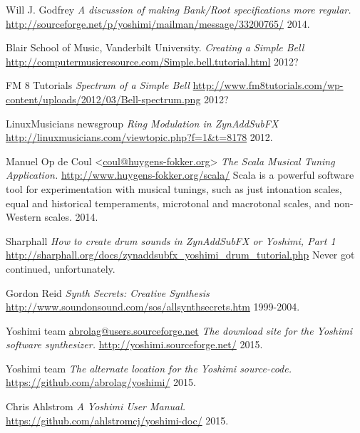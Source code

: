\begin{thebibliography}{99}

   Will J. Godfrey
   \emph{A discussion of making Bank/Root specifications more regular.}
   \url{http://sourceforge.net/p/yoshimi/mailman/message/33200765/}
   2014.

   Blair School of Music, Vanderbilt University.
   \emph{Creating a Simple Bell}
   \url{http://computermusicresource.com/Simple.bell.tutorial.html}
   2012?

   FM 8 Tutorials
   \emph{Spectrum of a Simple Bell}
   \url{http://www.fm8tutorials.com/wp-content/uploads/2012/03/Bell-spectrum.png}
   2012?

   LinuxMusicians newsgroup
   \emph{Ring Modulation in ZynAddSubFX}
   \url{http://linuxmusicians.com/viewtopic.php?f=1&t=8178}
   2012.

   Manuel Op de Coul <\url{coul@huygens-fokker.org}>
   \emph{The Scala Musical Tuning Application.}
   \url{http://www.huygens-fokker.org/scala/}
   Scala is a powerful software tool for experimentation with musical
   tunings, such as just intonation scales, equal and historical
   temperaments, microtonal and macrotonal scales, and non-Western scales.
   2014.

   Sharphall
   \emph{How to create drum sounds in ZynAddSubFX or Yoshimi, Part 1}
   \url{http://sharphall.org/docs/zynaddsubfx\_yoshimi\_drum\_tutorial.php}
   Never got continued, unfortunately.

   Gordon Reid
   \emph{Synth Secrets:  Creative Synthesis}
   \url{http://www.soundonsound.com/sos/allsynthsecrets.htm}
   1999-2004.

   Yoshimi team \url{abrolag@users.sourceforge.net}
   \emph{The download site for the Yoshimi software synthesizer.}
   \url{http://yoshimi.sourceforge.net/}
   2015.

   Yoshimi team
   \emph{The alternate location for the Yoshimi source-code.}
   \url{https://github.com/abrolag/yoshimi/}
   2015.

   Chris Ahlstrom
   \emph{A Yoshimi User Manual.}
   \url{https://github.com/ahlstromcj/yoshimi-doc/}
   2015.
   

\end{thebibliography}

